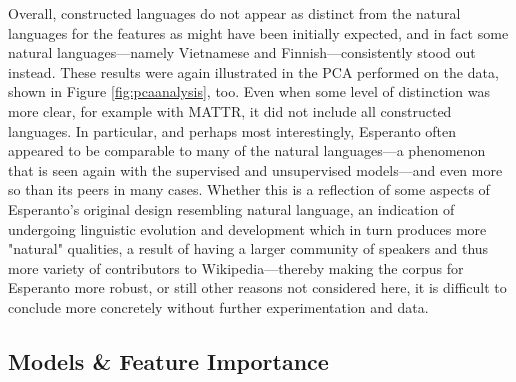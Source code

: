 \documentclass[12pt,a4paper]{article}
\numberwithin{figure}{section}
\numberwithin{table}{section}
\numberwithin{definition}{section}
\begin{document}
Overall, constructed languages do not appear as distinct from the natural languages for the features as might have been initially expected, and in fact some natural languages---namely Vietnamese and Finnish---consistently stood out instead. These results were again illustrated in the PCA performed on the data, shown in Figure \ref{fig:pcaanalysis}, too. Even when some level of distinction was more clear, for example with MATTR, it did not include all constructed languages. In particular, and perhaps most interestingly, Esperanto often appeared to be comparable to many of the natural languages---a phenomenon that is seen again with the supervised and unsupervised models---and even more so than its peers in many cases. Whether this is a reflection of some aspects of Esperanto's original design resembling natural language, an indication of undergoing linguistic evolution and development which in turn produces more "natural" qualities, a result of having a larger community of speakers and thus more variety of contributors to Wikipedia---thereby making the corpus for Esperanto more robust, or still other reasons not considered here, it is difficult to conclude more concretely without further experimentation and data. 







\subsection{Models \& Feature Importance}
\label{ssec:modelsandfeatureimportance}
\end{document}
